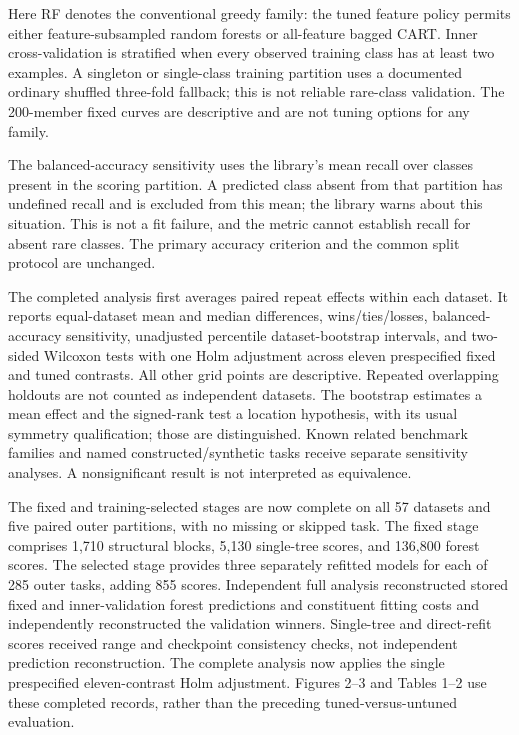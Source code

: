 \documentclass[11pt]{article}
\begin{document}
Here RF denotes the conventional greedy family: the tuned feature policy permits either feature-subsampled random forests or all-feature bagged CART. Inner cross-validation is stratified when every observed training class has at least two examples. A singleton or single-class training partition uses a documented ordinary shuffled three-fold fallback; this is not reliable rare-class validation. The 200-member fixed curves are descriptive and are not tuning options for any family.

The balanced-accuracy sensitivity uses the library's mean recall over classes present in the scoring partition. A predicted class absent from that partition has undefined recall and is excluded from this mean; the library warns about this situation. This is not a fit failure, and the metric cannot establish recall for absent rare classes. The primary accuracy criterion and the common split protocol are unchanged.

The completed analysis first averages paired repeat effects within each dataset. It reports equal-dataset mean and median differences, wins/ties/losses, balanced-accuracy sensitivity, unadjusted percentile dataset-bootstrap intervals, and two-sided Wilcoxon tests with one Holm adjustment across eleven prespecified fixed and tuned contrasts. All other grid points are descriptive. Repeated overlapping holdouts are not counted as independent datasets. The bootstrap estimates a mean effect and the signed-rank test a location hypothesis, with its usual symmetry qualification; those are distinguished. Known related benchmark families and named constructed/synthetic tasks receive separate sensitivity analyses. A nonsignificant result is not interpreted as equivalence.

The fixed and training-selected stages are now complete on all 57 datasets
and five paired outer partitions, with no missing or skipped task. The fixed
stage comprises 1,710 structural blocks, 5,130 single-tree scores, and 136,800
forest scores. The selected stage provides three separately refitted models
for each of 285 outer tasks, adding 855 scores. Independent full analysis
reconstructed stored fixed and inner-validation forest predictions and
constituent fitting costs and independently reconstructed the validation
winners. Single-tree and direct-refit scores received range and checkpoint
consistency checks, not independent prediction reconstruction. The complete
analysis now applies the single prespecified eleven-contrast Holm adjustment.
Figures 2--3 and Tables 1--2 use these completed records, rather than the
preceding tuned-versus-untuned evaluation.
\end{document}
